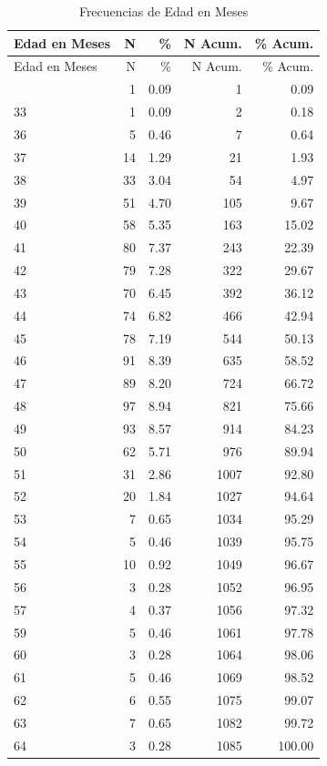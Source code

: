 \documentclass[
]{article}
\begin{document}
\begin{longtable}[]{@{}lrrrr@{}}
\caption{Frecuencias de Edad en Meses}\tabularnewline
\toprule\noalign{}
Edad en Meses & N & \% & N Acum. & \% Acum. \\
\midrule\noalign{}
\endfirsthead
\toprule\noalign{}
Edad en Meses & N & \% & N Acum. & \% Acum. \\
\midrule\noalign{}
\endhead
\bottomrule\noalign{}
\endlastfoot
32 & 1 & 0.09 & 1 & 0.09 \\
33 & 1 & 0.09 & 2 & 0.18 \\
36 & 5 & 0.46 & 7 & 0.64 \\
37 & 14 & 1.29 & 21 & 1.93 \\
38 & 33 & 3.04 & 54 & 4.97 \\
39 & 51 & 4.70 & 105 & 9.67 \\
40 & 58 & 5.35 & 163 & 15.02 \\
41 & 80 & 7.37 & 243 & 22.39 \\
42 & 79 & 7.28 & 322 & 29.67 \\
43 & 70 & 6.45 & 392 & 36.12 \\
44 & 74 & 6.82 & 466 & 42.94 \\
45 & 78 & 7.19 & 544 & 50.13 \\
46 & 91 & 8.39 & 635 & 58.52 \\
47 & 89 & 8.20 & 724 & 66.72 \\
48 & 97 & 8.94 & 821 & 75.66 \\
49 & 93 & 8.57 & 914 & 84.23 \\
50 & 62 & 5.71 & 976 & 89.94 \\
51 & 31 & 2.86 & 1007 & 92.80 \\
52 & 20 & 1.84 & 1027 & 94.64 \\
53 & 7 & 0.65 & 1034 & 95.29 \\
54 & 5 & 0.46 & 1039 & 95.75 \\
55 & 10 & 0.92 & 1049 & 96.67 \\
56 & 3 & 0.28 & 1052 & 96.95 \\
57 & 4 & 0.37 & 1056 & 97.32 \\
59 & 5 & 0.46 & 1061 & 97.78 \\
60 & 3 & 0.28 & 1064 & 98.06 \\
61 & 5 & 0.46 & 1069 & 98.52 \\
62 & 6 & 0.55 & 1075 & 99.07 \\
63 & 7 & 0.65 & 1082 & 99.72 \\
64 & 3 & 0.28 & 1085 & 100.00 \\
\end{longtable}
\end{document}
